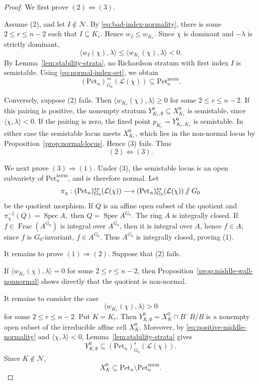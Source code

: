 \documentclass[12pt, reqno]{amsart}
\newcommand{\sslash}{\mathbin{/\mkern-6mu/}}
\theoremstyle{plain}
\numberwithin{equation}{section}
\theoremstyle{definition}
\begin{document}
\begin{proof}
We first prove \((2)\Longleftrightarrow(3)\).

Assume (2), and let \(I\notin\mathcal N\). By
\eqref{eq:bad-index-normality}, there is some \(2\le r\le n-2\)
such that $I\subseteq K_r.$ Hence \(w_I\le w_{K_r}\). Since \(\chi\) is dominant and
\(-\lambda\) is strictly dominant,
\[
\langle w_I(\chi),\lambda\rangle
\le
\langle w_{K_r}(\chi),\lambda\rangle
<0.
\]
By Lemma~\ref{lem:stability-strata}, no Richardson stratum with first index \(I\) is semistable.
Using \eqref{eq:normal-index-set}, we obtain
\[
(\mathrm{Pet}_n)^{ss}_{G_0}(\mathcal L(\chi))
\subseteq
\mathrm{Pet}_n^{\mathrm{norm}}.
\]

Conversely, suppose (2) fails. Then $\langle w_{K_r}(\chi),\lambda\rangle\ge0$
for some \(2\le r\le n-2\). If this pairing is positive, the
nonempty stratum $Y^0_{K_r,\emptyset}\subseteq X_{K_r}^0$ is semistable, since $\langle\chi,\lambda\rangle<0.$
If the pairing is zero, the fixed point $p_{K_r}=Y^0_{K_r,K_r}$
is semistable. In either case the semistable locus meets
\(X_{K_r}^0\), which lies in the non-normal locus by
Proposition~\ref{prop:normal-locus}. Hence (3) fails. Thus
\[
(2)\Longleftrightarrow(3).
\]

We next prove \((3)\Rightarrow(1)\). Under (3), the semistable locus
is an open subvariety of \(\mathrm{Pet}_n^{\mathrm{norm}}\), and is
therefore normal. Let
\[
\pi_\chi:
(\mathrm{Pet}_n)^{ss}_{G_0}(\mathcal L(\chi))
\longrightarrow
(\mathrm{Pet}_n)^{ss}_{G_0}(\mathcal L(\chi))
\sslash G_0
\]
be the quotient morphism. If \(Q\) is an affine open subset of
the quotient and $\pi_\chi^{-1}(Q)=\operatorname{Spec}A,$
then $Q=\operatorname{Spec}A^{G_0}.$
The ring \(A\) is integrally closed. If $f\in\operatorname{Frac}(A^{G_0})$ is integral over \(A^{G_0}\), then it is integral over \(A\), hence
\(f\in A\); since \(f\) is \(G_0\)-invariant, \(f\in A^{G_0}\).
Thus \(A^{G_0}\) is integrally closed, proving (1).

It remains to prove \((1)\Rightarrow(2)\). Suppose that (2) fails.

If $\langle w_{K_r}(\chi),\lambda\rangle=0$ for some \(2\le r\le n-2\), then
Proposition~\ref{prop:middle-wall-nonnormal} shows directly that the
quotient is non-normal.

It remains to consider the case
\begin{equation}\label{eq:positive-middle-normality}
\langle w_{K_r}(\chi),\lambda\rangle>0
\end{equation}
for some \(2\le r\le n-2\). Put \(K=K_r\). Then $Y^0_{K,\emptyset}
=
X_K^0\cap B^-B/B$
is a nonempty open subset of the irreducible affine cell \(X_K^0\).
Moreover, by \eqref{eq:positive-middle-normality} and
\(\langle\chi,\lambda\rangle<0\), Lemma~\ref{lem:stability-strata}
gives
\[
Y^0_{K,\emptyset}
\subseteq
(\mathrm{Pet}_n)^s_{G_0}(\mathcal L(\chi)).
\]
Since \(K\notin\mathcal N\),
\[
X_K^0
\subseteq
\mathrm{Pet}_n\setminus\mathrm{Pet}_n^{\mathrm{norm}}.
\]


\end{proof}
\end{document}
